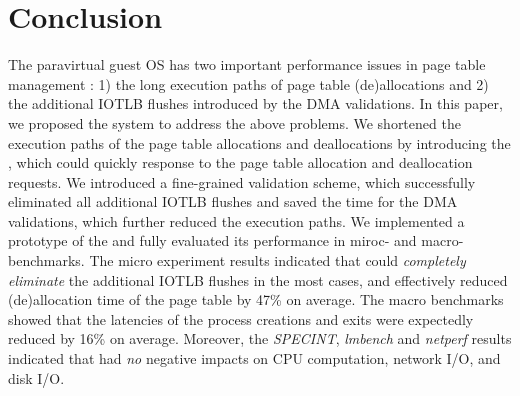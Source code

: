 \section{Conclusion} \label{sec:con}
The paravirtual guest OS has two important performance issues in page table management : 1) the long execution paths of page table (de)allocations and 2) the additional IOTLB flushes introduced by the DMA validations.
In this paper, we proposed the \name system to address the above problems.
We shortened the execution paths of the page table allocations and deallocations by introducing the \cache, which could quickly response to the page table allocation and deallocation requests.
We introduced a fine-grained validation scheme, which successfully eliminated all additional IOTLB flushes and saved the time for the DMA validations, which further reduced the execution paths.
We implemented a prototype of the \name and fully evaluated its performance in miroc- and macro-benchmarks.
The micro experiment results indicated that \name could \emph{completely eliminate} the additional IOTLB flushes in the most cases, and effectively reduced (de)allocation time of the page table by 47\% on average.
The macro benchmarks showed that the latencies of the process creations and exits were expectedly reduced by 16\% on average.
Moreover, the \emph{SPECINT}, \emph{lmbench} and \emph{netperf} results indicated that \name had \emph{no} negative impacts on CPU computation, network I/O, and disk I/O.
